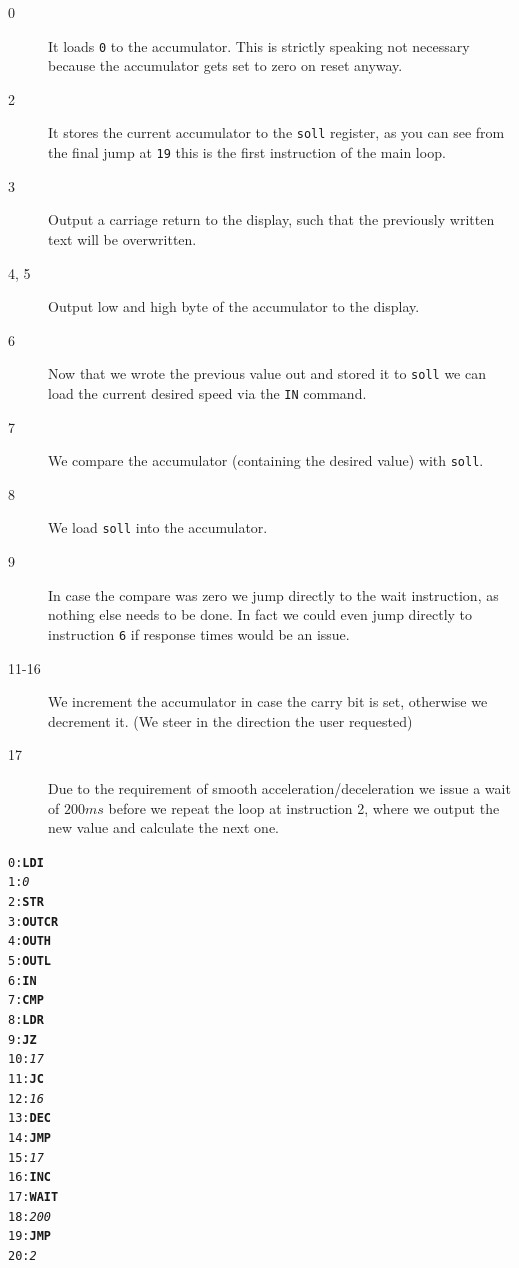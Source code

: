 \documentclass[a4paper,10pt]{scrartcl}
\begin{document}
\begin{minipage}[t]{0.85\linewidth}
  \begin{description}
  \item[0] It loads \texttt{0} to the accumulator. This is strictly speaking
    not necessary because the accumulator gets set to zero on reset
    anyway.
  \item[2] It stores the current accumulator to the \texttt{soll} register, as
    you can see from the final jump at \texttt{19} this is the first
    instruction of the main loop.
  \item[3] Output a carriage return to the display, such that the previously
    written text will be overwritten.
  \item[4, 5] Output low and high byte of the accumulator to the display.
  \item[6] Now that we wrote the previous value out and stored it to
    \texttt{soll} we can load the current desired speed via the
    \texttt{IN} command.
  \item[7] We compare the accumulator (containing the desired value) with \texttt{soll}.
  \item[8] We load \texttt{soll} into the accumulator.
  \item[9] In case the compare was zero we jump directly to the wait
    instruction, as nothing else needs to be done. In fact we could even
    jump directly to instruction \texttt{6} if response times would be an
    issue.
  \item[11-16] We increment the accumulator in case the carry bit is set,
    otherwise we decrement it. (We steer in the direction the user
    requested)
  \item[17] Due to the requirement of smooth acceleration/deceleration we
    issue a wait of $200 ms$ before we repeat the loop at instruction 2,
    where we output the new value and calculate the next one.
  \end{description}
\end{minipage}
\begin{minipage}[t]{0.15\linewidth}
  \begin{alltt}\footnotesize
    0: \textbf{LDI }
    1: \textit{0}
    2: \textbf{STR}
    3: \textbf{OUTCR}
    4: \textbf{OUTH}
    5: \textbf{OUTL}
    6: \textbf{IN}
    7: \textbf{CMP}
    8: \textbf{LDR}
    9: \textbf{JZ }
    10: \textit{17}
    11: \textbf{JC }
    12: \textit{16}
    13: \textbf{DEC}
    14: \textbf{JMP }
    15: \textit{17}
    16: \textbf{INC}
    17: \textbf{WAIT }
    18: \textit{200}
    19: \textbf{JMP }
    20: \textit{2}
  \end{alltt} 
\end{minipage}
\end{document}
